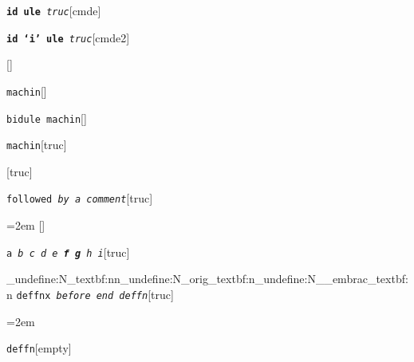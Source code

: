 \documentclass{book}
\newenvironment{GNUTexinfopreformatted}{%
  \par\begingroup\obeylines\obeyspaces\frenchspacing}{\endgroup}
\begin{document}
%
\noindent\texttt{\textbf{id ule} \EmbracOn{}\textnormal{\textsl{truc}}\EmbracOff{}}\hfill[cmde]



%
\noindent\texttt{\textbf{id `\texttt{i}' ule} \EmbracOn{}\textnormal{\textsl{truc}}\EmbracOff{}}\hfill[cmde2]



%
\noindent\texttt{}\hfill[]



\noindent\texttt{machin}\hfill[]



%
\noindent\texttt{bidule machin}\hfill[]



%
\noindent\texttt{machin}\hfill[truc]



%
\noindent\texttt{}\hfill[truc]



\noindent\texttt{followed \EmbracOn{}\textnormal{\textsl{by a comment}}\EmbracOff{}}\hfill[truc]



%
\begin{GNUTexinfopreformatted}
\leftskip=2em \parskip=0pt \parindent=0pt \ttfamily%
\end{GNUTexinfopreformatted}
\noindent\texttt{}\hfill[]



\noindent\texttt{a \EmbracOn{}\textnormal{\textsl{b c d e \textbf{f g} h i}}\EmbracOff{}}\hfill[truc]


\ExplSyntaxOn%
\cs_undefine:N{\embrac_textbf:nn}\cs_undefine:N{\embrac_orig_textbf:n}\cs_undefine:N{\__embrac_textbf:n}%
\ExplSyntaxOff%
%
\noindent\texttt{deffnx \EmbracOn{}\textnormal{\textsl{before end deffn}}\EmbracOff{}}\hfill[truc]



%
\begin{GNUTexinfopreformatted}
\leftskip=2em \parskip=0pt \parindent=0pt \ttfamily%


\end{GNUTexinfopreformatted}
\noindent\texttt{deffn}\hfill[empty]
\end{document}
